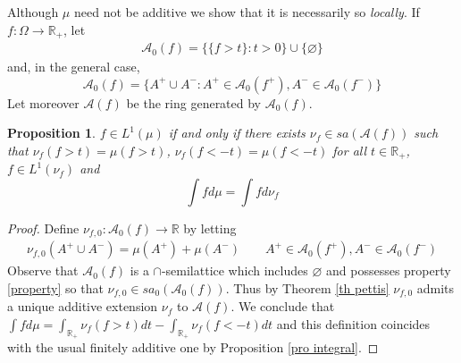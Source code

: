 \documentclass[11pt]{amsart}
\theoremstyle{plain}
\newtheorem{proposition}{Proposition}
\begin{document}
Although $\mu$ need not be additive we show that it is necessarily so \textit{locally}.
If $f:\Omega\to{\mathbb{R}}_+$, let 
\begin{align}
\label{A+(f)}
{\mathscr{A}}_0(f)=\{\{f>t\}:t>0\}\cup\{{\varnothing}\}
\end{align}
and, in the general case,
\begin{equation}
\label{A0(f)}
{\mathscr{A}}_0(f)=\{A^+\cup A^-:A^+\in{\mathscr{A}}_0(f^+),A^-\in{\mathscr{A}}_0(f^-)\}
\end{equation}
Let moreover
${\mathscr{A}}(f)$ be the ring generated by ${\mathscr{A}}_0(f)$. 

\begin{proposition}
\label{pro local}
$f\in L^1(\mu)$ if and only if there exists $\nu_f\in sa({\mathscr{A}}(f))$ such that 
$\nu_f(f>t)=\mu(f>t)$, $\nu_f(f<-t)=\mu(f<-t)$ for all $t\in{\mathbb{R}}_+$, $f\in L^1(\nu_f)$
and
\begin{equation}
\int fd\mu=\int fd\nu_f
\end{equation}
\end{proposition}

\begin{proof}
Define 
$\nu_{f,0}:{\mathscr{A}}_0(f)\to{\mathbb{R}}$ by letting
\begin{align*}
\nu_{f,0}(A^+\cup A^-)=\mu(A^+)+\mu(A^-)
\qquad A^+\in{\mathscr{A}}_0(f^+),A^-\in{\mathscr{A}}_0(f^-)
\end{align*}
Observe that ${\mathscr{A}}_0(f)$ is a $\cap$-semilattice which includes ${\varnothing}$ and possesses 
property \eqref{property} so that $\nu_{f,0}\in sa_0({\mathscr{A}}_0(f))$. Thus by Theorem 
\ref{th pettis} $\nu_{f,0}$ admits a unique additive extension $\nu_f$ to ${\mathscr{A}}(f)$. 
We conclude that $\int fd\mu=\int_{{\mathbb{R}}_+}\nu_f(f>t)dt-\int_{{\mathbb{R}}_+}\nu_f(f<-t)dt$ and 
this definition coincides with the usual finitely additive one by Proposition \ref{pro integral}.
\end{proof}
\end{document}
